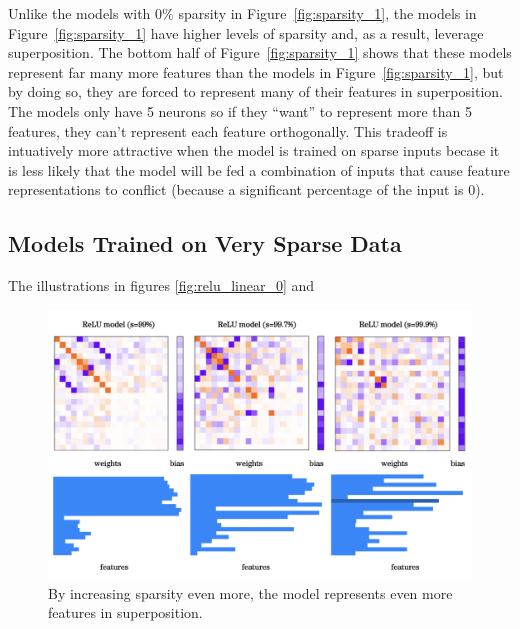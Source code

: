\documentclass{article} %
\begin{document}
Unlike the models with 0\% sparsity in Figure~\ref{fig:sparsity_1}, the models
in Figure~\ref{fig:sparsity_1} have higher levels of sparsity and, as
a result, leverage superposition. The bottom half of Figure~\ref{fig:sparsity_1}
shows that these models represent far many more features than the models in
Figure~\ref{fig:sparsity_1}, but by doing so, they are forced to represent many 
of their features in superposition. The models only have 5 neurons so if they 
``want'' to represent more than 5 features, they can't represent each feature 
orthogonally. This tradeoff is intuatively more attractive when the model is
trained on sparse inputs becase it is less likely that the model will be fed
a combination of inputs that cause feature representations to conflict (because
a significant percentage of the input is 0).


\subsection{Models Trained on Very Sparse Data}

The illustrations in figures \ref{fig:relu_linear_0} and 

\begin{figure}[h]
    \centering
    \includegraphics[width=0.75\linewidth]{demonstrating_superposition/images/sparsity_superposition2.png}
    \captionsetup{font=footnotesize, width=0.7\linewidth} %
    \caption{
        By increasing sparsity even more, the model represents even more
        features in superposition.
    }
    \label{fig:sparsity_2}
\end{figure}



\end{document}
